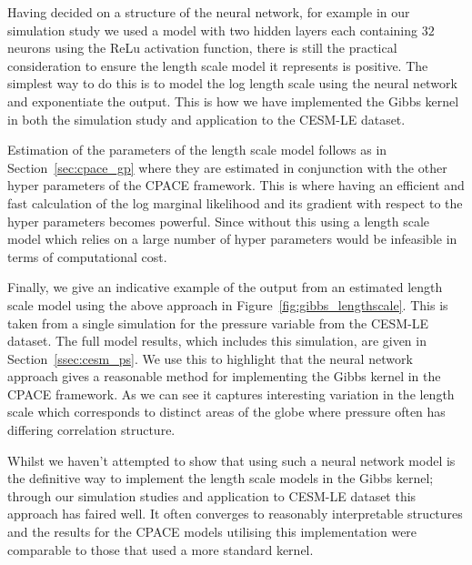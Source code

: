 Having decided on a structure of the neural network, for example in our simulation study we used a model with two hidden layers each containing $32$ neurons using the ReLu activation function, there is still the practical consideration to ensure the length scale model it represents is positive.
The simplest way to do this is to model the log length scale using the neural network and exponentiate the output.
This is how we have implemented the Gibbs kernel in both the simulation study and application to the CESM-LE dataset. 

Estimation of the parameters of the length scale model follows as in Section~\ref{sec:cpace_gp} where they are estimated in conjunction with the other hyper parameters of the CPACE framework.
This is where having an efficient and fast calculation of the log marginal likelihood and its gradient with respect to the hyper parameters becomes powerful.
Since without this using a length scale model which relies on a large number of hyper parameters would be infeasible in terms of computational cost.

Finally, we give an indicative example of the output from an estimated length scale model using the above approach in Figure~\ref{fig:gibbs_lengthscale}.
This is taken from a single simulation for the pressure variable from the CESM-LE dataset.
The full model results, which includes this simulation, are given in Section~\ref{ssec:cesm_ps}.
We use this to highlight that the neural network approach gives a reasonable method for implementing the Gibbs kernel in the CPACE framework.
As we can see it captures interesting variation in the length scale which corresponds to distinct areas of the globe where pressure often has differing correlation structure.


Whilst we haven't attempted to show that using such a neural network model is the definitive way to implement the length scale models in the Gibbs kernel; through our simulation studies and application to CESM-LE dataset this approach has faired well.
It often converges to reasonably interpretable structures and the results for the CPACE models utilising this implementation were comparable to those that used a more standard kernel.

